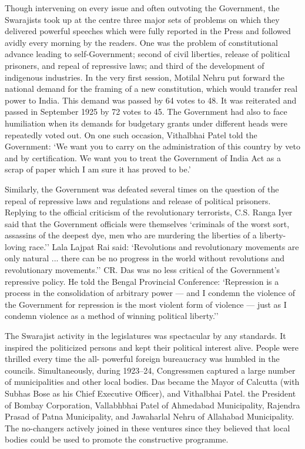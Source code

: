Though intervening on every issue and often outvoting the Government, the Swarajists took up at the centre three major sets of problems on which they delivered powerful speeches which were fully reported in the Press and followed avidly every morning by the readers. One was the problem of constitutional advance leading to self-Government; second of civil liberties, release of political prisoners, and repeal of repressive laws; and third of the development of indigenous industries. In the very first session, Motilal Nehru put forward the national demand for the framing of a new constitution, which would transfer real power to India. This demand was passed by 64 votes to 48. It was reiterated and passed in September 1925 by 72 votes to 45. The Government had also to face humiliation when its demands for budgetary grants under different heads were repeatedly voted out. On one such occasion, Vithalbhai Patel told the Government: `We want you to carry on the administration of this country by veto and by certification. We want you to treat the Government of India Act as a scrap of paper which I am sure it has proved to be.'

Similarly, the Government was defeated several times on the question of the repeal of repressive laws and regulations and release of political prisoners. Replying to the official criticism of the revolutionary terrorists, C.S. Ranga Iyer said that the Government officials were themselves `criminals of the worst sort, assassins of the deepest dye, men who are murdering the liberties of a liberty-loving race.'' Lala Lajpat Rai said: `Revolutions and revolutionary movements are only natural ... there can be no progress in the world without revolutions and revolutionary movements.'' CR. Das was no less critical of the Government's repressive policy. He told the Bengal Provincial Conference: `Repression is a process in the consolidation of arbitrary power --- and I condemn the violence of the Government for repression is the most violent form of violence --- just as I condemn violence as a method of winning political liberty.''

The Swarajist activity in the legislatures was spectacular by any standards. It inspired the politicized persons and kept their political interest alive. People were thrilled every time the all- powerful foreign bureaucracy was humbled in the councils. Simultaneously, during 1923--24, Congressmen captured a large number of municipalities and other local bodies. Das became the Mayor of Calcutta (with Subhas Bose as his Chief Executive Officer), and Vithalbhai Patel. the President of Bombay Corporation, Vallabhbhai Patel of Ahmedabad Municipality, Rajendra Prasad of Patna Municipality, and Jawaharlal Nehru of Allahabad Municipality. The no-changers actively joined in these ventures since they believed that local bodies could be used to promote the constructive programme.

